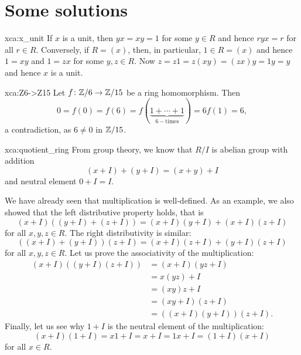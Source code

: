 \chapter*{Some solutions}

\pagestyle{plain}
\fancyhf{}
\fancyfoot[CE,CO]{\leftmark}
\fancyfoot[LE,RO]{\thepage}


\begin{sol}{xca:x_unit}
If $x$ is a unit, then $yx=xy=1$ for some $y\in R$ and hence $ryx=r$ for all $r\in R$. Conversely, 
if $R=(x)$, then, in particular, $1\in R=(x)$ and hence $1=xy$ and $1=zx$ for some $y,z\in R$. Now
$z=z1=z(xy)=(zx)y=1y=y$ and hence $x$ is a unit. 
\end{sol}

\begin{sol}{xca:Z6->Z15}
    Let $f\colon\mathbb{Z}/6\to\mathbb{Z}/15$ be a ring homomorphism. Then 
    \[
    0=f(0)=f(6)=f(\underbrace{1+\cdots+1}_{6-\text{times}})=6f(1)=6,
    \]
    a contradiction, as $6\ne 0$ in $\mathbb{Z}/15$. 
\end{sol}

\begin{sol}{xca:quotient_ring}
From group theory, we know that $R/I$ is abelian group with addition 
\[
    (x+I)+(y+I)=(x+y)+I
\]
and neutral element $0+I=I$. 

We have already seen that multiplication is well-defined. 
As an example, we also showed that 
the left distributive property holds, that is 
\[
 (x+I)\left((y+I)+(z+I)\right)=(x+I)(y+I)+(x+I)(z+I)
\]
for all $x,y,z\in R$. The right distributivity is similar: 
\[
 \left((x+I)+(y+I)\right)(z+I)=(x+I)(z+I)+(y+I)(z+I)
\]
for all $x,y,z\in R$. 
Let us prove the associativity of the
multiplication: 
\begin{align*}
    (x+I)\left((y+I)(z+I)\right) &= (x+I)(yz+I)\\
    &=x(yz)+I\\
    &=(xy)z+I\\
    &=(xy+I)(z+I)\\
    &=\left((x+I)(y+I)\right)(z+I).
\end{align*}
Finally, let us see why $1+I$ is the neutral element of the multiplication:
\[
(x+I)(1+I)=x1+I=x+I=1x+I=(1+I)(x+I)
\]
for all $x\in R$. 
\end{sol}

